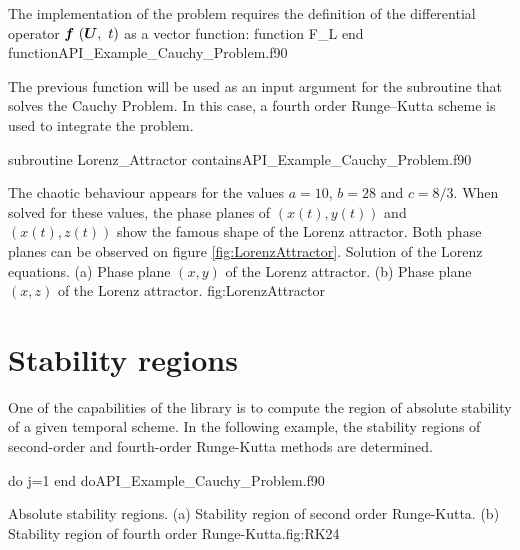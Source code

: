  The implementation of the problem requires the definition of the differential operator $ \vect{f}\ (\vect{U},\ t) $  as a vector function:
 \vspace{0.5cm} 
 {function F_L}
 {end function}{API_Example_Cauchy_Problem.f90}
 
 The previous function will be used as an input argument for the subroutine that solves the Cauchy Problem. 
 In this case, a fourth order  Runge--Kutta scheme is used to integrate the problem. 

 
 \newpage
 \vspace{0.5cm} 
 {subroutine Lorenz_Attractor}
 {contains}{API_Example_Cauchy_Problem.f90}

  The chaotic behaviour appears for the values $a =10$, $b=28 $ and $c=8/3$. When solved for these values, the phase planes of $(x(t),y(t))$ and $(x(t),z(t))$ show the famous shape of the Lorenz attractor. Both phase planes can be observed on figure \ref{fig:LorenzAttractor}.
 {Solution of the Lorenz equations. (a) Phase plane $(x,y)$ of the Lorenz attractor. (b) Phase plane $(x,z)$ of the Lorenz attractor. }{fig:LorenzAttractor}
 



 
 \FloatBarrier
 
 \section{Stability regions}
 
  One of the capabilities of the library is to compute the region of absolute stability of a given temporal scheme. 
  In the following example, the stability regions of second-order and fourth-order  Runge-Kutta methods are determined. 
 
 \vspace{0.5cm} 
 {do j=1}
 {end do}{API_Example_Cauchy_Problem.f90}
 
 \twographs{}
           {}
           {Absolute stability regions. (a) Stability region of second order Runge-Kutta. (b) Stability region of fourth order  Runge-Kutta.}{fig:RK24}
 
